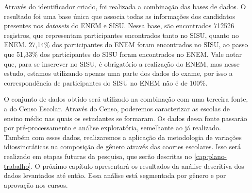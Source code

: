 Através do identificador criado, foi realizada a combinação das bases de dados. O resultado foi uma base única que associa todas as informações dos candidatos presentes nos \textit{datasets} do ENEM e SISU. Nessa base, são encontrados 712526 registros, que representam participantes encontrados tanto no SISU, quanto no ENEM. 27,14\% dos participantes do ENEM foram encontrados no SISU, ao passo que 51,33\% dos participantes do SISU foram encontrados no ENEM. Vale notar que, para se inscrever no SISU, é obrigatório a realização do ENEM, mas nesse estudo, estamos utilizando apenas uma parte dos dados do exame, por isso a correspondência de participantes do SISU no ENEM não é de 100\%.

O conjunto de dados obtido será utilizado na combinação com uma terceira fonte, a do Censo Escolar. Através do Censo, poderemos caracterizar as escolas de ensino médio nas quais os estudantes se formaram. Os dados dessa fonte passarão por pré-processamento e análise exploratória, semelhante ao já realizado. Também com esses dados, realizaremos a aplicação da metodologia de variações idiossincráticas na composição de gênero através das coortes escolares. Isso será realizado em etapas futuras da pesquisa, que serão descritas no \autoref{cap:plano-trabalho}. O próximo capítulo apresentará os resultados da análise descritiva dos dados levantados até então. Essa análise está segmentada por gênero e por aprovação nos cursos.